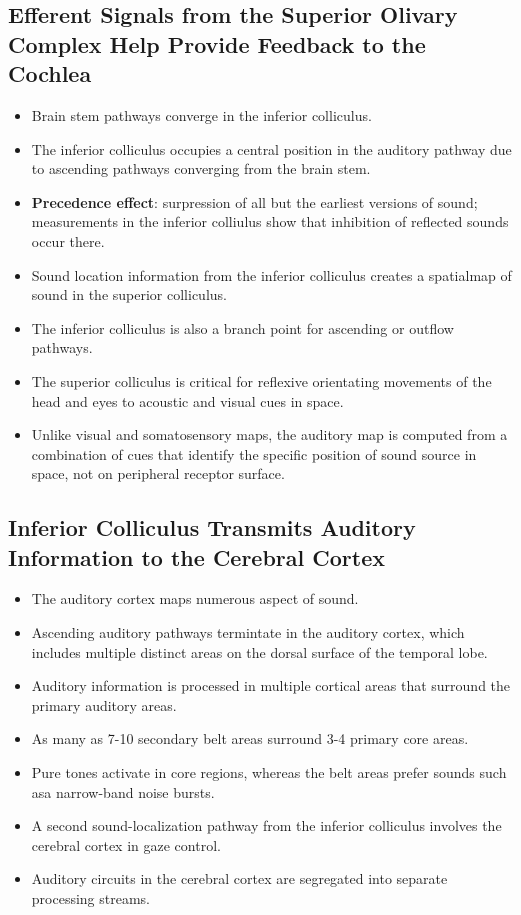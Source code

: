 \documentclass[12pt,a4paper]{article}
\begin{document}
\subsection{Efferent Signals from the Superior Olivary Complex Help Provide Feedback to the Cochlea}
\begin{itemize}
    \item Brain stem pathways converge in the inferior colliculus.
    \item The inferior colliculus occupies a central position in the auditory pathway due to ascending pathways converging from the brain stem.
    \item \textbf{Precedence effect}: surpression of all but the earliest versions of sound; measurements in the inferior colliulus show that inhibition of reflected sounds occur there.
    \item Sound location information from the inferior colliculus creates a spatialmap of sound in the superior colliculus.
    \item The inferior colliculus is also a branch point for ascending or outflow pathways.
    \item The superior colliculus is critical for reflexive orientating movements of the head and eyes to acoustic and visual cues in space.
    \item Unlike visual and somatosensory maps, the auditory map is computed from a combination of cues that identify the specific position of sound source in space, not on peripheral receptor surface.
\end{itemize}

\subsection{Inferior Colliculus Transmits Auditory Information to the Cerebral Cortex}
\begin{itemize}
    \item The auditory cortex maps numerous aspect of sound.
    \item Ascending auditory pathways termintate in the auditory cortex, which includes multiple distinct areas on the dorsal surface of the temporal lobe.
    \item Auditory information is processed in multiple cortical areas that surround the primary auditory areas.
    \item As many as 7-10 secondary belt areas surround 3-4 primary core areas.
    \item Pure tones activate in core regions, whereas the belt areas prefer sounds such asa narrow-band noise bursts.
    \item A second sound-localization pathway from the inferior colliculus involves the cerebral cortex in gaze control.
    \item Auditory circuits in the cerebral cortex are segregated into separate processing streams.
\end{itemize}
\end{document}
